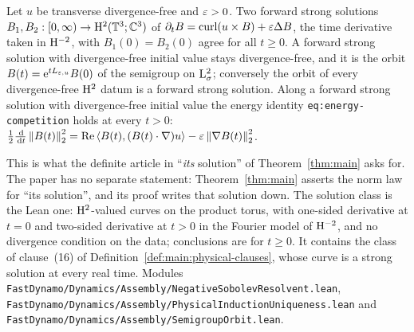 \begin{lemma}
  \label{lem:dynamics:physical-uniqueness}
  \leanok
  Let $u$ be transverse divergence-free and $\varepsilon>0$.  Two forward strong solutions
  $B_1,B_2:[0,\infty)\to\mathrm{H}^2(\mathbb{T}^3;\mathbb{C}^3)$ of
  $\partial_tB=\operatorname{curl}(u\times B)+\varepsilon\Delta B$, the time derivative taken in $\mathrm{H}^{-2}$, with
  $B_1(0)=B_2(0)$ agree for all $t\geq0$.  A forward strong solution with divergence-free
  initial value stays divergence-free, and it is the orbit
  $B(t)=\mathrm{e}^{tL_{\varepsilon,u}}B(0)$ of the semigroup on $\mathrm{L}^2_\sigma$; conversely the orbit of
  every divergence-free $\mathrm{H}^2$ datum is a forward strong solution.  Along a forward strong
  solution with divergence-free initial value the energy identity
  \texttt{eq:energy-competition} holds at every $t>0$:
  $\frac12\frac{\,\mathrm{d}}{\,\mathrm{d} t}\left\|B(t)\right\|_2^2
  =\operatorname{Re}\left\langle B(t),(B(t)\cdot\nabla)u\right\rangle-\varepsilon\left\|\nabla B(t)\right\|_2^2$.
\end{lemma}

This is what the definite article in ``\emph{its} solution'' of Theorem~\ref{thm:main} asks
for.  The paper has no separate statement: Theorem~\ref{thm:main} asserts the norm law for
``its solution'', and its proof writes that solution down.  The solution class is the Lean
one: $\mathrm{H}^2$-valued curves on the product torus, with one-sided derivative at $t=0$ and
two-sided derivative at $t>0$ in the Fourier model of $\mathrm{H}^{-2}$, and no divergence condition
on the data; conclusions are for $t\geq0$.  It contains the class of clause~(16) of
Definition~\ref{def:main:physical-clauses}, whose curve is a strong solution at every real
time.  Modules \texttt{FastDynamo/Dynamics/Assembly/NegativeSobolevResolvent.lean},
\texttt{FastDynamo/Dynamics/Assembly/PhysicalInductionUniqueness.lean} and
\texttt{FastDynamo/Dynamics/Assembly/SemigroupOrbit.lean}.


